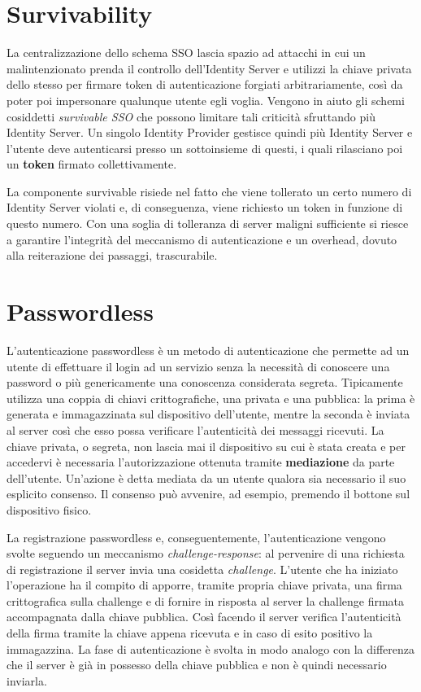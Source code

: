 \section{Survivability}
\label{surviv}

La centralizzazione dello schema SSO lascia spazio ad attacchi in cui un malintenzionato prenda il controllo dell'Identity Server e utilizzi la chiave privata dello stesso per firmare token di autenticazione forgiati arbitrariamente, così da poter poi impersonare qualunque utente egli voglia. Vengono in aiuto gli schemi cosiddetti \emph{survivable SSO} che possono limitare tali criticità sfruttando più Identity Server. Un singolo Identity Provider gestisce quindi più Identity Server e l'utente deve autenticarsi presso un sottoinsieme di questi, i quali rilasciano poi un \textbf{token} firmato collettivamente. 

La componente survivable risiede nel fatto che viene tollerato un certo numero di Identity Server violati e, di conseguenza, viene richiesto un token in funzione di questo numero. Con una soglia di tolleranza di server maligni sufficiente si riesce a garantire l'integrità del meccanismo di autenticazione e un overhead, dovuto alla reiterazione dei passaggi, trascurabile.

\section{Passwordless}
\label{passwordless}

L'autenticazione passwordless è un metodo di autenticazione che permette ad un utente di effettuare il login ad un servizio senza la necessità di conoscere una password o più genericamente una conoscenza considerata segreta. Tipicamente utilizza una coppia di chiavi crittografiche, una privata e una pubblica: la prima è generata e immagazzinata sul dispositivo dell'utente, mentre la seconda è inviata al server così che esso possa verificare l'autenticità dei messaggi ricevuti. La chiave privata, o segreta, non lascia mai il dispositivo su cui è stata creata e per accedervi è necessaria l'autorizzazione ottenuta tramite \textbf{mediazione} da parte dell'utente. Un'azione è detta mediata da un utente qualora sia necessario il suo esplicito consenso. Il consenso può avvenire, ad esempio, premendo il bottone sul dispositivo fisico.

La registrazione passwordless e, conseguentemente, l'autenticazione vengono svolte seguendo un meccanismo \emph{challenge-response}: al pervenire di una richiesta di registrazione il server invia una cosidetta \emph{challenge}. L'utente che ha iniziato l'operazione ha il compito di apporre, tramite propria chiave privata, una firma crittografica sulla challenge e di fornire in risposta al server la challenge firmata accompagnata dalla chiave pubblica. Così facendo il server verifica l'autenticità della firma tramite la chiave appena ricevuta e in caso di esito positivo la immagazzina. La fase di autenticazione è svolta in modo analogo con la differenza che il server è già in possesso della chiave pubblica e non è quindi necessario inviarla.

